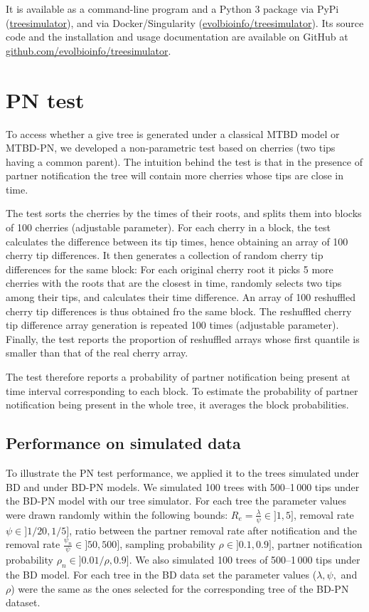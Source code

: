 \documentclass[a4paper,10pt]{article}
\begin{document}
It is available as a command-line program and a Python 3 package via PyPi (\href{https://pypi.org/project/treesimulator}{treesimulator}), and via Docker/Singularity (\href{https://hub.docker.com/r/evolbioinfo/treesimulator/tags}{evolbioinfo/treesimulator}). Its source code and the installation and usage documentation are available on GitHub at \href{https://github.com/evolbioinfo/treesimulator}{github.com/evolbioinfo/treesimulator}.


\section{PN test}
To access whether a give tree is generated under a classical MTBD model or MTBD-PN, we developed a non-parametric test based on cherries (two tips having a common parent). 
The intuition behind the test is that in the presence of partner notification the tree will contain more cherries whose tips are close in time. 

The test sorts the cherries by the times of their roots, and splits them into blocks of 100 cherries (adjustable parameter). For each cherry in a block, the test calculates the difference between its tip times, hence obtaining an array of 100 cherry tip differences. It then generates a collection of random cherry tip differences for the same block: For each original cherry root it picks 5 more cherries with the roots that are the closest in time, randomly selects two tips among their tips, and calculates their time difference. An array of 100 reshuffled cherry tip differences is thus obtained fro the same block. The reshuffled cherry tip difference array generation is repeated 100 times (adjustable parameter). Finally, the test reports the proportion of reshuffled arrays whose first quantile is smaller than that of the real cherry array. 

The test therefore reports a probability of partner notification being present at time interval corresponding to each block. To estimate the probability of partner notification being present in the whole tree, it averages the block probabilities. 


\subsection{Performance on simulated data}
To illustrate the PN test performance, we applied it to the trees simulated under BD and under BD-PN models. We simulated 100 trees with 500--1\,000 tips under the BD-PN model with our tree simulator. For each tree the parameter values were drawn randomly within the following bounds:
$R_e = \frac{{\lambda}}{{\psi}} \in ]1, 5]$, 
removal rate $\psi \in ]1 / 20, 1 / 5]$,
ratio between the partner removal rate after notification and the removal rate $\frac{\psi_n}{\psi} \in ]50, 500]$,
sampling probability $\rho \in ]0.1, 0.9]$,
partner notification probability $\rho_n \in ]0.01/\rho, 0.9]$. We also simulated 100 trees of 500--1\,000 tips under the BD model. For each tree in the BD data set the parameter values ($\lambda, \psi,$ and $\rho$) were the same as the ones selected for the corresponding tree of the BD-PN dataset.
\end{document}
